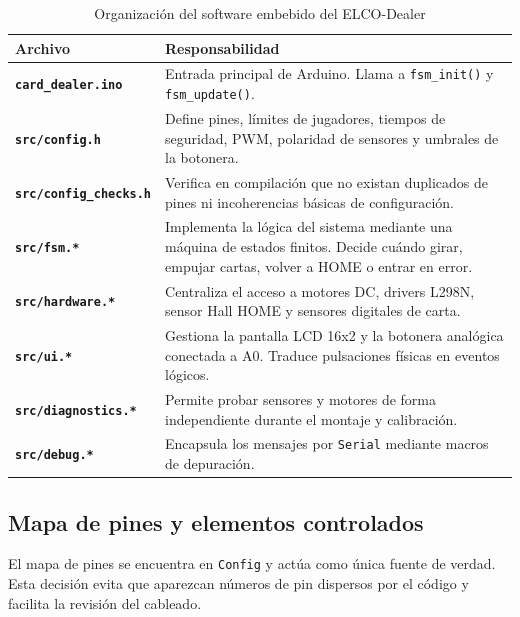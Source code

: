 \begin{table}[H]
\centering
\small
\begin{tabularx}{\textwidth}{>{\bfseries}p{}X}
\hline
\textbf{Archivo} & \textbf{Responsabilidad} \\
\hline
\texttt{card\_dealer.ino} & Entrada principal de Arduino. Llama a \texttt{fsm\_init()} y \texttt{fsm\_update()}. \\
\texttt{src/config.h} & Define pines, límites de jugadores, tiempos de seguridad, PWM, polaridad de sensores y umbrales de la botonera. \\
\texttt{src/config\_checks.h} & Verifica en compilación que no existan duplicados de pines ni incoherencias básicas de configuración. \\
\texttt{src/fsm.*} & Implementa la lógica del sistema mediante una máquina de estados finitos. Decide cuándo girar, empujar cartas, volver a HOME o entrar en error. \\
\texttt{src/hardware.*} & Centraliza el acceso a motores DC, drivers L298N, sensor Hall HOME y sensores digitales de carta. \\
\texttt{src/ui.*} & Gestiona la pantalla LCD 16x2 y la botonera analógica conectada a A0. Traduce pulsaciones físicas en eventos lógicos. \\
\texttt{src/diagnostics.*} & Permite probar sensores y motores de forma independiente durante el montaje y calibración. \\
\texttt{src/debug.*} & Encapsula los mensajes por \texttt{Serial} mediante macros de depuración. \\
\hline
\end{tabularx}
\caption{Organización del software embebido del ELCO-Dealer}
\label{tab:software_files}
\end{table}

\subsection{Mapa de pines y elementos controlados}

El mapa de pines se encuentra en \texttt{Config} y actúa como única fuente de verdad. Esta decisión evita que aparezcan números de pin dispersos por el código y facilita la revisión del cableado.

